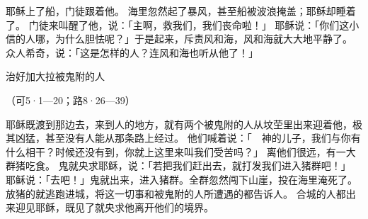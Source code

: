 {\par }{\PP {}耶稣上了船，门徒跟着他。
海里忽然起了暴风，甚至船被波浪掩盖；耶稣却睡着了。
门徒来叫醒了他，说：「主啊，救我们，我们丧命啦！」
耶稣说：「你们这小信的人哪，为什么胆怯呢？」于是起来，斥责风和海，风和海就大大地平静了。
众人希奇，说：「这是怎样的人？连风和海也听从他了！」
\par }{\SH 治好加大拉被鬼附的人
\par }{\R （可5·1—20；路8·26—39）
\par }{\PP {}耶稣既渡到那边去，来到{}人的地方，就有两个被鬼附的人从坟茔里出来迎着他，极其凶猛，甚至没有人能从那条路上经过。
他们喊着说：「　神的儿子，我们与你有什么相干？时候还没有到，你就上这里来叫我们受苦吗？」
离他们很远，有一大群猪吃食。
鬼就央求耶稣，说：「若把我们赶出去，就打发我们进入猪群吧！」
耶稣说：「去吧！」鬼就出来，进入猪群。全群忽然闯下山崖，投在海里淹死了。
放猪的就逃跑进城，将这一切事和被鬼附的人所遭遇的都告诉人。
合城的人都出来迎见耶稣，既见了就央求他离开他们的境界。

}
